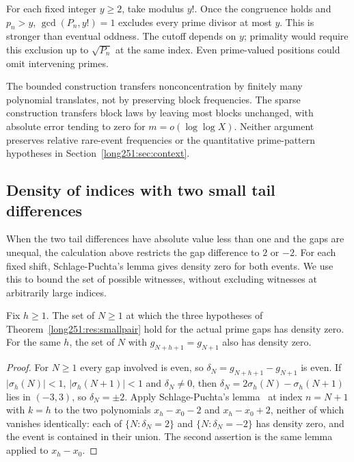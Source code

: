 \documentclass[11pt]{article}
\begin{document}
For each fixed integer $y\ge2$, take modulus $y!$.
Once the congruence holds and $p_n>y$, $\gcd(P_n,y!)=1$ excludes every
prime divisor at most $y$.  This is stronger than eventual oddness.
The cutoff depends on $y$; primality would require this exclusion up to
$\sqrt{P_n}$ at the same index.  Even prime-valued positions could omit
intervening primes.

The bounded construction transfers nonconcentration by finitely many
polynomial translates, not by preserving block frequencies.  The sparse
construction transfers block laws by leaving most blocks unchanged, with
absolute error tending to zero for $m=o(\log\log X)$.  Neither argument
preserves relative rare-event frequencies or the quantitative prime-pattern
hypotheses in Section~\ref{long251:sec:context}.

\subsection{Density of indices with two small tail differences}

When the two tail differences have absolute value less than one and the
gaps are unequal, the calculation above restricts the gap difference to
$2$ or $-2$.  For each fixed shift, Schlage-Puchta's lemma gives density zero
for both events.  We use this to bound the set of possible witnesses,
without excluding witnesses at arbitrarily large indices.

\begin{theorem}\label{long251:res:sparse}
Fix $h\ge1$.  The set of $N\ge1$ at which the three hypotheses of
Theorem~\ref{long251:res:smallpair} hold for the actual prime gaps has density zero.
For the same $h$, the set of $N$ with $g_{N+h+1}=g_{N+1}$ also has density
zero.
\end{theorem}


\begin{proof}
For $N\ge1$ every gap involved is even, so $\delta_N=g_{N+h+1}-g_{N+1}$ is
even.  If $|\sigma_h(N)|<1$, $|\sigma_h(N+1)|<1$ and $\delta_N\ne0$, then
$\delta_N=2\sigma_h(N)-\sigma_h(N+1)$ lies in $(-3,3)$, so $\delta_N=\pm2$.
Apply Schlage-Puchta's lemma~\cite[Lemma~4]{schlagepuchta2011} at index
$n=N+1$ with $k=h$ to the two
polynomials $x_h-x_0-2$ and $x_h-x_0+2$, neither of which vanishes
identically: each of $\{N:\delta_N=2\}$ and $\{N:\delta_N=-2\}$ has density
zero, and the event is contained in their union.  The second assertion is the
same lemma applied to $x_h-x_0$.
\end{proof}
\end{document}
